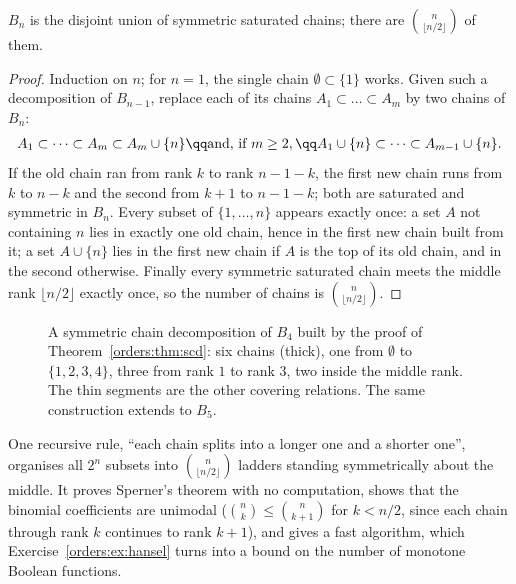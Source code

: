 \begin{theorem}\label{orders:thm:scd}
$B_n$ is the disjoint union of symmetric saturated chains; there are $\binom n{\lfloor n/2\rfloor}$ of them.
\end{theorem}
\begin{proof}
Induction on $n$; for $n=1$, the single chain $\emptyset\subset\{1\}$ works. Given such a decomposition of $B_{n-1}$, replace each of its chains
$A_1\subset\dots\subset A_m$ by two chains of $B_n$:
\[
\begin{gathered}A_1\subset\dots\subset A_m\subset A_m\cup\{n\}\qq\text{and, if }m\ge2,\qq A_1\cup\{n\}\subset\dots\subset A_{m-1}\cup\{n\}.\end{gathered}
\]
If the old chain ran from rank $k$ to rank $n-1-k$, the first new chain runs from $k$ to $n-k$ and the second from $k+1$ to $n-1-k$; both are
saturated and symmetric in $B_n$. Every subset of $\{1,\dots,n\}$ appears exactly once: a set $A$ not containing $n$ lies in exactly one old chain,
hence in the first new chain built from it; a set $A\cup\{n\}$ lies in the first new chain if $A$ is the top of its old chain, and in the
second otherwise. Finally every symmetric saturated chain meets the middle rank $\lfloor n/2\rfloor$ exactly once, so the number of chains is
$\binom n{\lfloor n/2\rfloor}$.
\end{proof}

\begin{figure}[ht]
\centering
{}
\caption{A symmetric chain decomposition of $B_4$ built by the proof of Theorem~\ref{orders:thm:scd}: six chains (thick), one from $\emptyset$ to
$\{1,2,3,4\}$, three from rank $1$ to rank $3$, two inside the middle rank. The thin segments are the other covering
relations. The same construction extends to $B_5$.}
\label{orders:fig:scd}
\end{figure}

\begin{beauty}
One recursive rule, ``each chain splits into a longer one and a shorter one'', organises all $2^n$ subsets into
$\binom n{\lfloor n/2\rfloor}$ ladders standing symmetrically about the middle. It proves Sperner's theorem with no computation, shows that the
binomial coefficients are unimodal ($\binom nk\le\binom n{k+1}$ for $k<n/2$, since each chain through rank $k$ continues to rank $k+1$), and gives a
fast algorithm, which Exercise~\ref{orders:ex:hansel} turns into a bound on the number of monotone Boolean functions.
\end{beauty}

